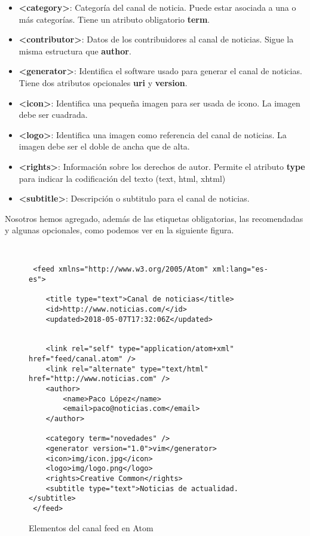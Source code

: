\begin{enumerate}
    \begin{itemize}
        \item \textbf{<category>}: Categoría del canal de noticia. Puede estar asociada a una o más categorías. Tiene un atributo obligatorio \textbf{term}.
        \item \textbf{<contributor>}: Datos de los contribuidores al canal de noticias. Sigue la misma estructura que \textbf{author}.
        \item \textbf{<generator>}: Identifica el software usado para generar el canal de noticias. Tiene dos atributos opcionales \textbf{uri} y \textbf{version}.
        \item \textbf{<icon>}: Identifica una pequeña imagen para ser usada de icono. La imagen debe ser cuadrada.
        \item \textbf{<logo>}: Identifica una imagen como referencia del canal de noticias. La imagen debe ser el doble de ancha que de alta.
        \item \textbf{<rights>}: Información sobre los derechos de autor. Permite el atributo \textbf{type} para indicar la codificación del texto (text, html, xhtml)
        \item \textbf{<subtitle>}: Descripción o subtitulo para el canal de noticias.
    \end{itemize}

    Nosotros hemos agregado, además de las etiquetas obligatorias, las recomendadas y algunas opcionales, como podemos ver en la siguiente figura.

    \begin{figure}[h]
        \begin{tcolorbox}[sharp corners, colback=yellow!30, colframe=white!20]
            \scriptsize
            \begin{verbatim}


 <feed xmlns="http://www.w3.org/2005/Atom" xml:lang="es-es">

    <title type="text">Canal de noticias</title>
    <id>http://www.noticias.com/</id>
    <updated>2018-05-07T17:32:06Z</updated>


    <link rel="self" type="application/atom+xml" href="feed/canal.atom" />
    <link rel="alternate" type="text/html" href="http://www.noticias.com" />
    <author>
        <name>Paco López</name>
        <email>paco@noticias.com</email>
    </author>

    <category term="novedades" />
    <generator version="1.0">vim</generator>
    <icon>img/icon.jpg</icon>
    <logo>img/logo.png</logo>
    <rights>Creative Common</rights>
    <subtitle type="text">Noticias de actualidad.</subtitle>
 </feed>
            \end{verbatim}
        \end{tcolorbox}
        \caption{Elementos del canal feed en Atom}
    \end{figure}


\end{enumerate}
